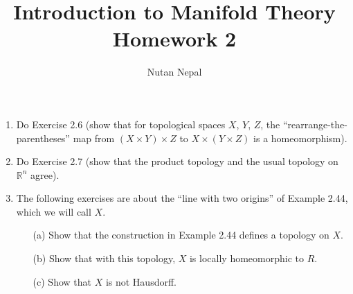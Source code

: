 \documentclass[12pt]{article}
\title{\textbf{Introduction to Manifold Theory} \\
\large Homework 2
}
\author{Nutan Nepal}
\begin{document}
\maketitle
\makebox[\linewidth]{\rule{200mm}{1pt}}
\vspace{1mm}

\begin{enumerate}

\item Do Exercise 2.6 (show that for topological spaces
    $X$, $Y$, $Z$, the “rearrange-the-parentheses” map
    from $(X\times Y)\times Z$ to $X\times(Y\times Z)$
    is a homeomorphism).

\begin{mybox}

\vspace{30mm}
\end{mybox}


\item Do Exercise 2.7 (show that the product topology
    and the usual topology on $\mathbb{R}^n$ agree).
 
\begin{mybox}

\vspace*{30mm}
\end{mybox}
 
 
\item The following exercises are about the
“line with two origins” of Example 2.44, which we will
call $X$.
\begin{enumerate}
    \item[(a)] Show that the construction in Example 2.44
        defines a topology on $X$.
        \begin{mybox}

            \vspace*{30mm}
        \end{mybox}

    \item[(b)] Show that with this topology, $X$ is locally
        homeomorphic to $R$.
        \begin{mybox}

            \vspace*{30mm}
        \end{mybox}

    \item[(c)] Show that $X$ is not Hausdorff.
        \begin{mybox}

            \vspace*{30mm}
        \end{mybox}

\end{enumerate}

\end{enumerate}
\end{document}
